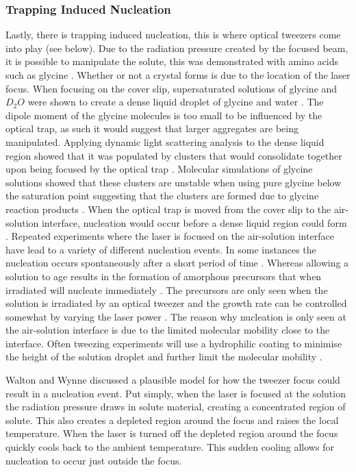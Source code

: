 \subsubsection{Trapping Induced Nucleation}
Lastly, there is trapping induced nucleation, this is where optical 
tweezers come into play (see below). Due to the radiation pressure 
created by the focused beam, it is possible to manipulate the solute, 
this was demonstrated with amino acids such as glycine \cite{Tsuboi2009}. 
Whether or not a crystal forms is due to the location of the laser 
focus. When focusing on the cover slip, supersaturated solutions 
of glycine and $D_2O$ were shown to create a dense liquid droplet 
of glycine and water \cite{Yuyama2010, Yuyama2012}. The dipole 
moment of the glycine molecules is too small to be influenced by 
the optical trap, as such it would suggest that larger aggregates 
are being manipulated. Applying dynamic light scattering analysis to 
the dense liquid region showed that it was populated by clusters that 
would consolidate together upon being focused by the optical trap 
\cite{Gowayed2021}. Molecular simulations of glycine solutions 
showed that these clusters are unstable when using pure glycine 
below the saturation point suggesting that the clusters are 
formed due to glycine reaction products \cite{Sweatman2022}. 
When the optical trap is moved from the cover slip to the 
air-solution interface, nucleation would occur before a dense 
liquid region could form \cite{Yuyama2010}. Repeated experiments 
where the laser is focused on the air-solution interface have 
lead to a variety of different nucleation events. In some 
instances the nucleation occurs spontaneously after a short 
period of time \cite{Yuyama2010}. Whereas allowing a solution to 
age results in the formation of amorphous precursors that when 
irradiated will nucleate immediately \cite{Liao2022}. The 
precursors are only seen when the solution is irradiated by an 
optical tweezer and the growth rate can be controlled somewhat 
by varying the laser power \cite{Liao2022}. The reason why 
nucleation is only seen at the air-solution interface is due 
to the limited molecular mobility close to the interface. 
Often tweezing experiments will use a hydrophilic coating to 
minimise the height of the solution droplet and further limit
the molecular mobility \cite{Yuyama2012, Gowayed2021}.

Walton and Wynne discussed a plausible model for how the tweezer 
focus could result in a nucleation event. Put simply, when the 
laser is focused at the solution the radiation pressure draws 
in solute material, creating a concentrated region of solute. 
This also creates a depleted region around the focus and raises 
the local temperature. When the laser is turned off the depleted 
region around the focus quickly cools back to the ambient 
temperature. This sudden cooling allows for nucleation to occur
just outside the focus.  

